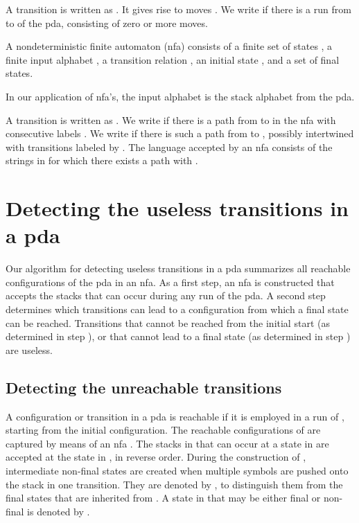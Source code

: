 \documentclass{llncs}
\begin{document}
A transition  is written as .
It gives rise to moves .
We write  if there is a run from  to  of the pda,
consisting of zero or more moves.

\begin{definition}\label{def:NFA}
A nondeterministic finite automaton (nfa) consists of
a finite set of states , a finite input alphabet ,
a transition relation , an initial state ,
and a set  of final states.
\end{definition}

\noindent
In our application of nfa's, the input alphabet is the stack alphabet  from the pda.

A transition  is written as .
We write  if there is a path from  to  in the nfa
with consecutive labels .
We write  if there is such a path from  to ,
possibly intertwined with transitions labeled by .
The language accepted by an nfa consists of the strings  in  for which there
exists a path  with .


\section{Detecting the useless transitions in a pda}

Our algorithm for detecting useless transitions in a pda summarizes all
reachable configurations of the pda in an nfa. As a first step, an nfa is constructed
that accepts the stacks that can occur during any run of the pda.
A second step determines which transitions can lead to a configuration
from which a final state can be reached. Transitions that cannot be reached from the
initial start (as determined in step ), or that cannot lead to a final state (as determined in step )
are useless.


\subsection{Detecting the unreachable transitions}
\label{sec:forward}

A configuration or transition in a pda  is reachable if it is employed in a run of ,
starting from the initial configuration. The reachable configurations of  are captured by means of an nfa .
The stacks in  that can occur at a state  in  are accepted at the state  in ,
in reverse order. During the construction of , intermediate non-final states
are created when multiple symbols are pushed onto the stack in one transition.
They are denoted by , to distinguish them from the final states  that are
inherited from . A state in  that may be either final or non-final is denoted by .
\end{document}
